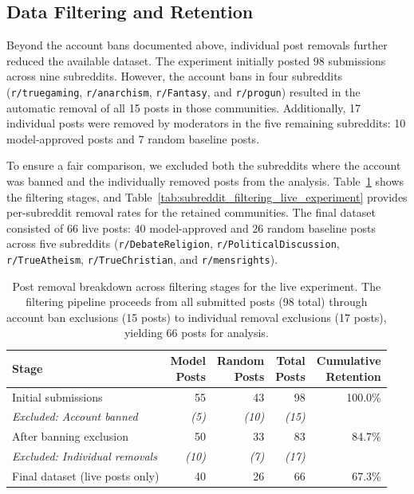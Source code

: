 \subsection{Data Filtering and Retention}
\label{subsec:live_filtering}

Beyond the account bans documented above, individual post removals further reduced the available dataset. The experiment initially posted 98 submissions across nine subreddits. However, the account bans in four subreddits (\verb!r/truegaming!, \verb!r/anarchism!, \verb!r/Fantasy!, and \verb!r/progun!) resulted in the automatic removal of all 15 posts in those communities. Additionally, 17 individual posts were removed by moderators in the five remaining subreddits: 10 model-approved posts and 7 random baseline posts.

To ensure a fair comparison, we excluded both the subreddits where the account was banned and the individually removed posts from the analysis. Table~\ref{tab:removal_breakdown} shows the filtering stages, and Table~\ref{tab:subreddit_filtering_live_experiment} provides per-subreddit removal rates for the retained communities. The final dataset consisted of 66 live posts: 40 model-approved and 26 random baseline posts across five subreddits (\verb!r/DebateReligion!, \verb!r/PoliticalDiscussion!, \verb!r/TrueAtheism!, \verb!r/TrueChristian!, and \verb!r/mensrights!).

\begin{table}[htbp]
\centering
\caption{Post removal breakdown across filtering stages for the live experiment. The filtering pipeline proceeds from all submitted posts (98 total) through account ban exclusions (15 posts) to individual removal exclusions (17 posts), yielding 66 posts for analysis.}
\label{tab:removal_breakdown}
\begin{tabular}{lrrrr}
\toprule
Stage & \makecell{Model\\Posts} & \makecell{Random\\Posts} & \makecell{Total\\Posts} & \makecell{Cumulative\\Retention} \\
\midrule
Initial submissions & 55 & 43 & 98 & 100.0\% \\
\midrule
\textit{Excluded: Account banned} & \textit{(5)} & \textit{(10)} & \textit{(15)} & \\
After banning exclusion & 50 & 33 & 83 & 84.7\% \\
\midrule
\textit{Excluded: Individual removals} & \textit{(10)} & \textit{(7)} & \textit{(17)} & \\
Final dataset (live posts only) & 40 & 26 & 66 & 67.3\% \\
\bottomrule
\end{tabular}
\vspace{0.2cm}
\end{table}

